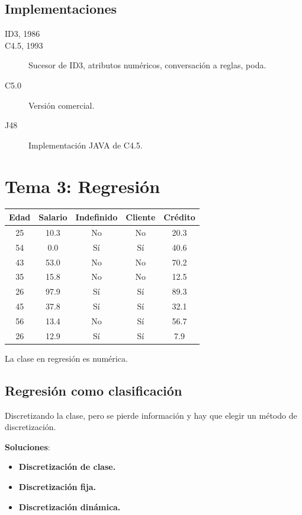 \documentclass[12pt, twoside, openright]{report} %
\begin{document}
\section{Implementaciones}

\begin{description}
	\item[ID3, 1986]
	\item[C4.5, 1993] Sucesor de ID3, atributos numéricos, conversación a reglas, poda.
	\item[C5.0] Versión comercial.
	\item[J48] Implementación JAVA de C4.5.
\end{description}

\chapter{Tema 3: Regresión}
\begin{table}[h]
  \begin{tabular}{c|c|c|c|c}
  \textbf{Edad} & \textbf{Salario} & \textbf{Indefinido} & \textbf{Cliente} & \textbf{Crédito} \\ \hline
  25 & 10.3 & No & No & 20.3 \\
  54 & 0.0  & Sí & Sí & 40.6 \\
  43 & 53.0 & No & No & 70.2 \\
  35 & 15.8 & No & No & 12.5 \\
  26 & 97.9 & Sí & Sí & 89.3 \\
  45 & 37.8 & Sí & Sí & 32.1 \\
  56 & 13.4 & No & Sí & 56.7 \\
  26 & 12.9 & Sí & Sí & 7.9  \\ \hline
  \end{tabular}
  \end{table}
La clase en regresión es numérica.

\section{Regresión como
clasificación}

Discretizando la clase, pero se pierde información y hay que elegir un
método de discretización.

\textbf{Soluciones}:

\begin{itemize}

\item
  \textbf{Discretización de clase.}
\item
  \textbf{Discretización fija.}
\item
  \textbf{Discretización dinámica.}
\end{itemize}
\end{document}
